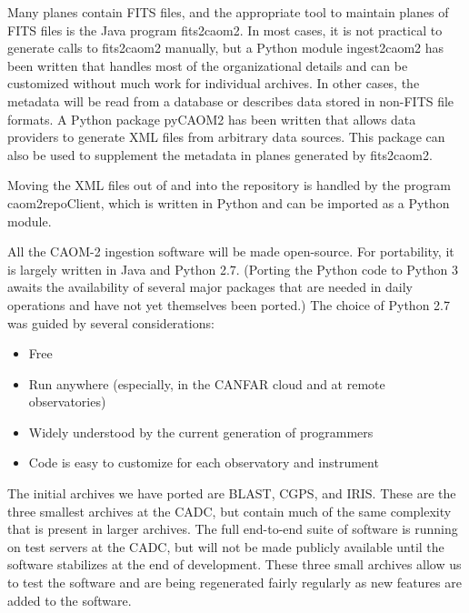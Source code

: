 Many planes contain FITS files, and the appropriate tool to maintain planes of FITS files is the Java program fits2caom2.  In most cases, it is not practical to generate calls to fits2caom2 manually, but a Python module ingest2caom2 has been written that handles most of the organizational details and can be customized without much work for individual archives.  In other cases, the metadata will be read from a database or describes data stored in non-FITS file formats.  A Python package pyCAOM2 has been written that allows data providers to generate XML files from arbitrary data sources.  This package can also be used to supplement the metadata in planes generated by fits2caom2.  

Moving the XML files out of and into the repository is handled by the program caom2repoClient, which is written in Python and can be imported as a Python module.
 
All the CAOM-2 ingestion software will be made open-source.  For portability, it is largely written in Java and Python 2.7.  (Porting the Python code to Python 3 awaits the availability of several major packages that are needed in daily operations and have not yet themselves been ported.) The choice of Python 2.7 was guided by several considerations:
\begin{itemize}
\item Free
\item Run anywhere (especially, in the CANFAR cloud and at remote observatories)
\item Widely understood by the current generation of programmers
\item Code is easy to customize for each observatory and instrument
\end{itemize}

The initial archives we have ported are BLAST, CGPS, and IRIS.  These are the three smallest archives at the CADC, but contain much of the same complexity that is present in larger archives.  The full end-to-end suite of software is running on test servers at the CADC, but will not be made publicly available until the software stabilizes at the end of development.  These three small archives allow us to test the software and are being regenerated fairly regularly as new features are added to the software.

